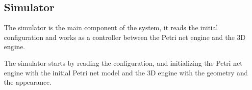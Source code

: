 \subsection{Simulator}

The simulator is the main component of the system, it reads the initial configuration and works as a controller between the Petri net engine and the 3D engine.

The simulator starts by reading the configuration, and initializing the Petri net engine with the initial Petri net model and the 3D engine with the geometry and the appearance. 

